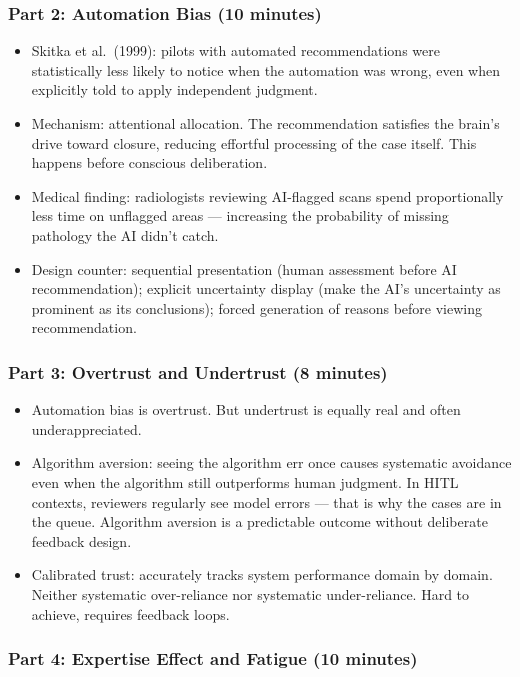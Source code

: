 \subsubsection{Part 2: Automation Bias (10 minutes)}

\begin{itemize}
    \item Skitka et al.\ (1999): pilots with automated recommendations were statistically less likely to notice when the automation was wrong, even when explicitly told to apply independent judgment.
    \item Mechanism: attentional allocation. The recommendation satisfies the brain's drive toward closure, reducing effortful processing of the case itself. This happens before conscious deliberation.
    \item Medical finding: radiologists reviewing AI-flagged scans spend proportionally less time on unflagged areas --- increasing the probability of missing pathology the AI didn't catch.
    \item Design counter: sequential presentation (human assessment before AI recommendation); explicit uncertainty display (make the AI's uncertainty as prominent as its conclusions); forced generation of reasons before viewing recommendation.
\end{itemize}

\subsubsection{Part 3: Overtrust and Undertrust (8 minutes)}

\begin{itemize}
    \item Automation bias is overtrust. But undertrust is equally real and often underappreciated.
    \item Algorithm aversion: seeing the algorithm err once causes systematic avoidance even when the algorithm still outperforms human judgment. In HITL contexts, reviewers regularly see model errors --- that is why the cases are in the queue. Algorithm aversion is a predictable outcome without deliberate feedback design.
    \item Calibrated trust: accurately tracks system performance domain by domain. Neither systematic over-reliance nor systematic under-reliance. Hard to achieve, requires feedback loops.
\end{itemize}

\subsubsection{Part 4: Expertise Effect and Fatigue (10 minutes)}

